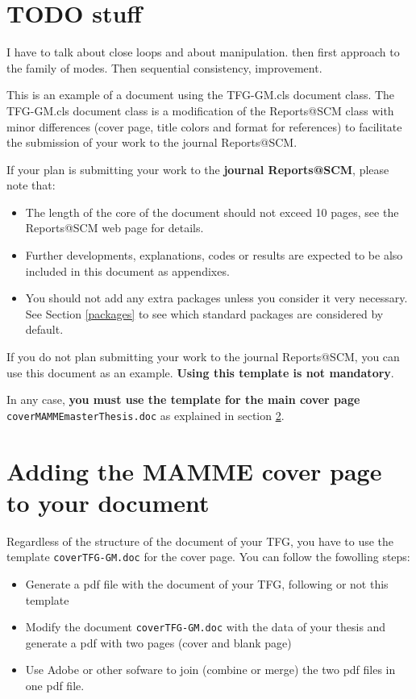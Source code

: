 \documentclass[12,twoside]{TFG-GM}
\theoremstyle{definition}
\theoremstyle{remark}
\begin{document}
\section{TODO stuff}
I have to talk about close loops and about manipulation. then first approach to the family of modes. Then sequential consistency, improvement.

This is an example of a document using the TFG-GM.cls document class. The TFG-GM.cls document class is a modification of the Reports@SCM class with minor differences (cover page, title colors and format for references) to facilitate the submission of your work to the journal Reports@SCM.

If your plan is submitting your work to the \textbf{journal Reports@SCM}, please note that:
\begin{itemize}
	\item The length of the core of the document should not exceed 10 pages, see the Reports@SCM web page for details.
	\item Further developments, explanations, codes or results are expected to be also included in this document as appendixes.
	\item You should not add any extra packages unless you consider it very necessary. See Section \ref{packages} to see which standard packages  are considered by default. 
\end{itemize} 

If you do not plan submitting your work to the journal  Reports@SCM, you can use this document as an example. \textbf{Using this template is not mandatory}.
 
In any case, \textbf{you must use the template for the main cover page} \texttt{coverMAMMEmasterThesis.doc} as explained in section \ref{sec:coverPage}.


\section{Adding the MAMME cover page to your document}
\label{sec:coverPage}
  
Regardless of the structure of the document of your TFG, you have to use the template \texttt{coverTFG-GM.doc} for the cover page. You can follow the fowolling steps:
\begin{itemize}
	\item Generate a pdf file with the document of your TFG, following or not this template
	\item Modify the document \texttt{coverTFG-GM.doc} with the data of your thesis and generate a pdf with two pages (cover and blank page)
	\item Use Adobe or other sofware to join (combine or merge) the two pdf files in one pdf file. 
\end{itemize}
 
\end{document}
